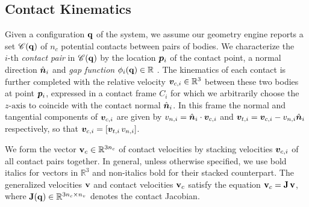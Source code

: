 \subsection{Contact Kinematics}
\label{sec:contact_modeling}

Given a configuration ${\mathbf{q}}$ of the system, we assume our geometry engine
reports a set $\mathscr{C}({\mathbf{q}})$ of $n_c$ potential contacts between pairs of
bodies. We characterize the $i\text{-th}$ \emph{contact pair} in
$\mathscr{C}({\mathbf{q}})$ by the location ${\bm{p}}_i$ of the contact point, a normal
direction $\hat{{\bm{n}}}_i$ and \emph{gap function} $\phi_i({\mathbf{q}})\in\mathbb{R}$
\cite{bib:flores2021contact,bib:pfeiffer1996multibody}. The kinematics of each
contact is further completed with the relative velocity
${\bm{v}}_{c,i}\in\mathbb{R}^3$ between these two bodies at point ${\bm{p}}_i$,
expressed in a contact frame $C_i$ for which we arbitrarily choose the
$z\text{-axis}$ to coincide with the contact normal $\hat{{\bm{n}}}_i$. In this
frame the normal and tangential components of ${\bm{v}}_{c,i}$ are given by
$v_{n,i} = \hat{{\bm{n}}}_i\cdot{\bm{v}}_{c,i}$ and ${\bm{v}}_{t,i} =
{\bm{v}}_{c,i}-v_{n,i}\hat{{\bm{n}}}_i$ respectively, so that
${\bm{v}}_{c,i}=[{\bm{v}}_{t,i}\,v_{n,i}]$.

We form the vector ${\mathbf{v}}_{c}\in\mathbb{R}^{3n_c}$ of contact velocities by
stacking velocities ${\bm{v}}_{c,i}$ of all contact pairs together. In general,
unless otherwise specified, we use bold italics for vectors in $\mathbb{R}^3$
and non-italics bold for their stacked counterpart. The generalized velocities
${\mathbf{v}}$ and contact velocities ${\mathbf{v}}_c$ satisfy the equation
${\mathbf{v}}_c={\mathbf{J}}\,{\mathbf{v}}$, where ${\mathbf{J}}({\mathbf{q}})\in\mathbb{R}^{3n_c\times n_v}$
denotes the contact Jacobian.
